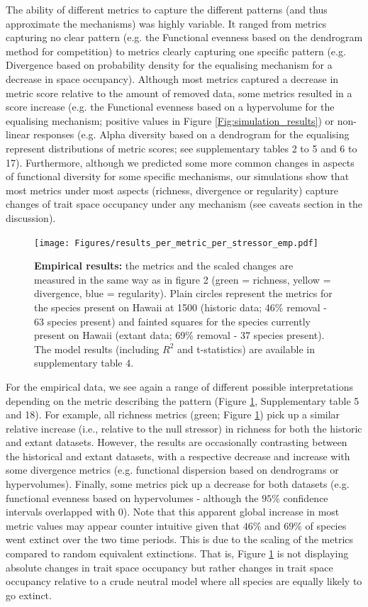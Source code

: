 \documentclass[12pt,letterpaper]{article}
\begin{document}
The ability of different metrics to capture the different patterns (and thus approximate the mechanisms) was highly variable.
It ranged from metrics capturing no clear pattern (e.g. the Functional evenness based on the dendrogram method for competition) to metrics clearly capturing one specific pattern (e.g. Divergence based on probability density for the equalising mechanism for a decrease in space occupancy).
Although most metrics captured a decrease in metric score relative to the amount of removed data, some metrics resulted in a score increase (e.g. the Functional evenness based on a hypervolume for the equalising mechanism; positive values in Figure \ref{Fig:simulation_results}) or non-linear responses (e.g. Alpha diversity based on a dendrogram for the equalising represent distributions of metric scores; see supplementary tables 2 to 5 and 6 to 17).
Furthermore, although we predicted some more common changes in aspects of functional diversity for some specific mechanisms, our simulations show that most metrics under most aspects (richness, divergence or regularity) capture changes of trait space occupancy under any mechanism (see caveats section in the discussion).

\begin{figure}[!htbp]
\centering
   \texttt{[image: Figures/results\_per\_metric\_per\_stressor\_emp.pdf]}
\caption{\scriptsize{\textbf{Empirical results:} the metrics and the scaled changes are measured in the same way as in figure 2 (green = richness, yellow = divergence, blue = regularity).
Plain circles represent the metrics for the species present on Hawaii at 1500 (historic data; 46\% removal - 63 species present) and fainted squares for the species currently present on Hawaii (extant data; 69\% removal - 37 species present).
The model results (including $R^{2}$ and t-statistics) are available in supplementary table 4.
}}
\label{Fig:empirical_results}
\end{figure}
\bigskip

For the empirical data, we see again a range of different possible interpretations depending on the metric describing the pattern (Figure \ref{Fig:empirical_results}, Supplementary table 5 and 18).
For example, all richness metrics (green; Figure \ref{Fig:empirical_results}) pick up a similar relative increase (i.e., relative to the null stressor) in richness for both the historic and extant datasets.
However, the results are occasionally contrasting between the historical and extant datasets, with a respective decrease and increase with some divergence metrics (e.g. functional dispersion based on dendrograms or hypervolumes).
Finally, some metrics pick up a decrease for both datasets (e.g. functional evenness based on hypervolumes - although the $95$\% confidence intervals overlapped with $0$).
Note that this apparent global increase in most metric values may appear counter intuitive given that $46$\% and $69$\% of species went extinct over the two time periods.
This is due to the scaling of the metrics compared to random equivalent extinctions.
That is, Figure \ref{Fig:empirical_results} is not displaying absolute changes in trait space occupancy but rather changes in trait space occupancy relative to a crude neutral model where all species are equally likely to go extinct.
\end{document}
